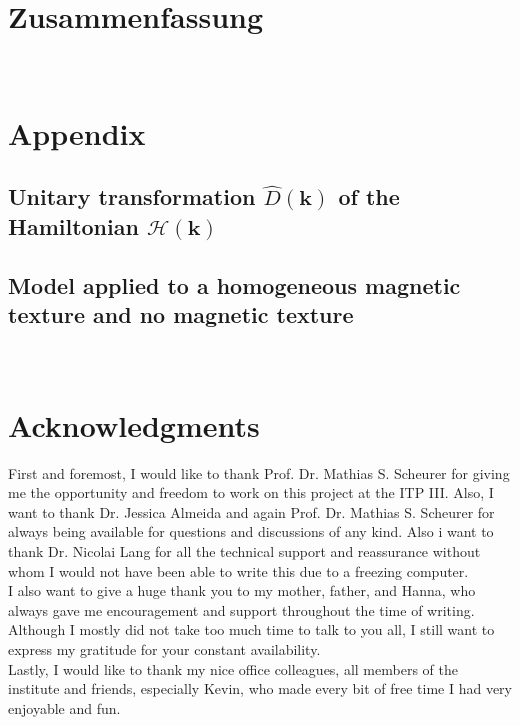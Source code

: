 \documentclass[a4paper,12pt,bibliography=totocnumbered, headings=small]{scrbook}
\numberwithin{equation}{chapter} %
\begin{document}
\chapter*{Zusammenfassung}


\newpage
\thispagestyle{empty}

 
\tableofcontents
\thispagestyle{empty}


\newpage
\thispagestyle{empty}
~
\newpage

\clearpage 
\setcounter{page}{1}










\FloatBarrier



\newpage

\clearpage
\appendix
\chapter{Appendix}
\section{Unitary transformation $\hat{D}(\mathbf{k})$ of the Hamiltonian $\mathcal{H}(\mathbf{k})$}
\section{Model applied to a homogeneous magnetic texture and no magnetic texture}



\thispagestyle{empty}
~
\thispagestyle{empty}
\printbibliography

\newpage


\chapter*{Acknowledgments}
First and foremost, I would like to thank Prof. Dr. Mathias S. Scheurer for giving me the opportunity and freedom to work on this project at the ITP III. Also, I want to thank Dr. Jessica Almeida and again Prof. Dr. Mathias S. Scheurer for always being available for questions and discussions of any kind.
Also i want to thank Dr. Nicolai Lang for all the technical support and reassurance without whom I would not have been able to write this due to a freezing computer.\\
I also want to give a huge thank you to my mother, father, and Hanna, who always gave me encouragement and support throughout the time of writing. Although I mostly did not take too much time to talk to you all, I still want to express my gratitude for your constant availability.\\
Lastly, I would like to thank my nice office colleagues, all members of the institute and friends, especially Kevin, who made every bit of free time I had very enjoyable and fun.\\
\end{document}
